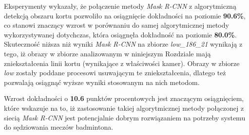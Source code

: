 Eksperymenty wykazały, że połączenie metody \textit{Mask R-CNN} z algorytmiczną detekcją obszaru kortu pozwoliło na osiągnięcie dokładności na poziomie \textbf{90.6\%}, co stanowi znaczący wzrost w porównaniu do samej algorytmicznej metody wykorzystywanej dotychczas, która osiągnęła dokładność na poziomie \textbf{80.0\%}.
Skuteczność niższa niż wyniki \textit{Mask R-CNN} na zbiorze \textit{low\_186\_21} wynikają z tego, iż obrazy w zbiorze analizowanym w niniejszym Rozdziale mają zniekształcenia linii kortu (wynikające z właściwości kamer). Obrazy w zbiorze \textit{low} zostały poddane procesowi usuwającym te zniekształcenia, dlatego też pozwalają osiągnąć wyższe wyniki stosowanym na nich metodom.

Wzrost dokładności o \textbf{10.6} punktów procentowych jest znaczącym osiągnięciem, które wskazuje na to, iż zastosowanie takiej algorytmicznej metody połączonej z siecią \textit{Mask R-CNN} jest potencjalnie dobrym rozwiązaniem na potrzeby systemu do sędziowania meczów badmintona.
